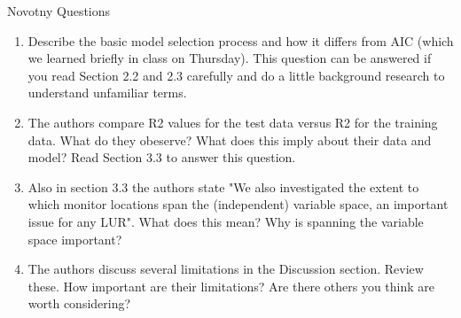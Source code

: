 \documentclass[aspectratio=169]{beamer}
\begin{document}
\begin{frame}{Novotny Questions}
\begin{enumerate}
  \item Describe the basic model selection process and how it differs from AIC (which we learned briefly in class on Thursday).  This question can be answered if you read Section 2.2 and 2.3 carefully and do a little background research to understand unfamiliar terms. 
  \item The authors compare R2 values for the test data versus R2 for the training data.  What do they obeserve?  What does this imply about their data and model?  Read Section 3.3 to answer this question.  
  \item  Also in section 3.3 the authors state "We also investigated the extent to which monitor locations span the (independent) variable space, an important issue for any LUR".  What does this mean?  Why is spanning the variable space important?
  \item The authors discuss several limitations in the Discussion section.  Review these.  How important are their limitations?  Are there others you think are worth considering?
\end{enumerate}
\end{frame}
\end{document}
